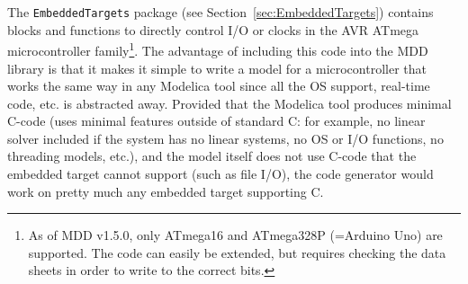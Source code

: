 \documentclass{resources/modelica}
\newcommand{\modelica}[1]{\lstinline[language=modelica]|#1|}
\begin{document}

The \modelica{EmbeddedTargets} package (see Section~\ref{sec:EmbeddedTargets}) contains
blocks and functions to directly control I/O or clocks in the AVR ATmega microcontroller family\footnote{As of MDD
v1.5.0, only ATmega16 and ATmega328P (=Arduino Uno) are supported.
The code can easily be extended, but requires checking the data sheets in order
to write to the correct bits.}.
The advantage of including this code into the MDD library is that it makes it
simple to write a model for a microcontroller that works the same way
in any Modelica tool since all the OS support, real-time code, etc. is
abstracted away.
Provided that the Modelica tool produces minimal C-code (uses minimal features
outside of standard C: for example, no linear solver included if the system has no linear systems,
no OS or I/O functions, no threading models, etc.),
and the model itself does not use C-code that the embedded target cannot support
(such as file I/O), the code generator would work on pretty much any embedded
target supporting C.
\end{document}
